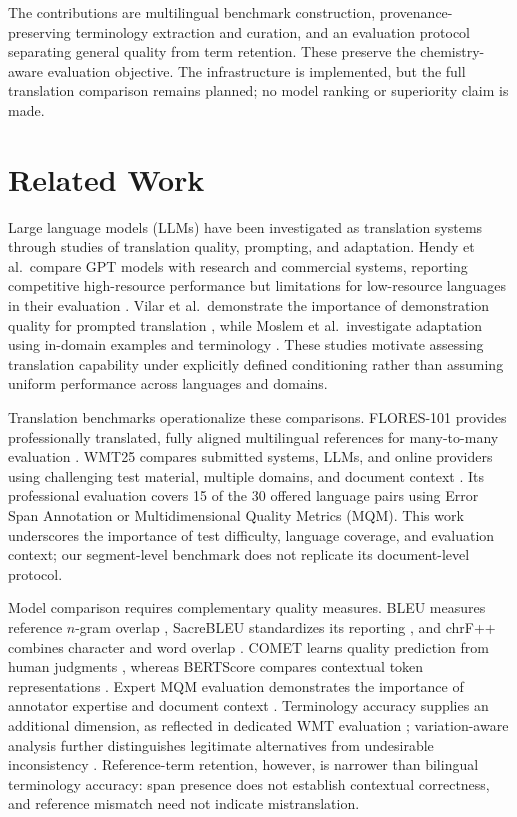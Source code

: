 \documentclass[11pt]{article}
\begin{document}
The contributions are multilingual benchmark construction, provenance-preserving terminology
extraction and curation, and an evaluation protocol separating general quality from term retention.
These preserve the chemistry-aware evaluation objective. The infrastructure is implemented, but
the full translation comparison remains planned; no model ranking or superiority claim is made.

\section{Related Work}
\label{sec:resources}

Large language models (LLMs) have been investigated as translation systems through studies of
translation quality, prompting, and adaptation. Hendy et al.\ compare GPT models with research
and commercial systems, reporting competitive high-resource performance but limitations for
low-resource languages in their evaluation \cite{hendy2023}. Vilar et al.\ demonstrate the
importance of demonstration quality for prompted translation \cite{vilar2023}, while Moslem
et al.\ investigate adaptation using in-domain examples and terminology \cite{moslem2023}.
These studies motivate assessing translation capability under explicitly defined conditioning
rather than assuming uniform performance across languages and domains.

Translation benchmarks operationalize these comparisons. FLORES-101 provides professionally
translated, fully aligned multilingual references for many-to-many evaluation \cite{goyal2022}.
WMT25 compares submitted systems, LLMs, and online providers using challenging test material,
multiple domains, and document context \cite{kocmi2025}. Its professional evaluation covers
15 of the 30 offered language pairs using Error Span Annotation or Multidimensional Quality
Metrics (MQM). This work underscores the importance of test difficulty, language coverage,
and evaluation context; our segment-level benchmark does not replicate its document-level protocol.

Model comparison requires complementary quality measures. BLEU measures reference $n$-gram
overlap \cite{papineni2002}, SacreBLEU standardizes its reporting \cite{post2018}, and chrF++
combines character and word overlap \cite{popovic2017}. COMET learns quality prediction from
human judgments \cite{rei2020}, whereas BERTScore compares contextual token representations
\cite{zhang2020}. Expert MQM evaluation demonstrates the importance of annotator expertise
and document context \cite{freitag2021}. Terminology accuracy supplies an additional dimension,
as reflected in dedicated WMT evaluation \cite{alam2021}; variation-aware analysis further
distinguishes legitimate alternatives from undesirable inconsistency \cite{dahan2026}.
Reference-term retention, however, is narrower than bilingual terminology accuracy: span presence
does not establish contextual correctness, and reference mismatch need not indicate mistranslation.
\end{document}
